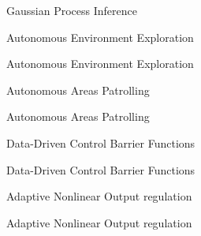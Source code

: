 \documentclass[10pt,aspectratio=169]{beamer}
\begin{document}
\begin{frame}[t]{Gaussian Process Inference}  
	
\end{frame}

\begin{frame}[t]{Autonomous Environment Exploration}
	
\end{frame}

\begin{frame}[t]{Autonomous Environment Exploration}
	
\end{frame}

\begin{frame}[t]{Autonomous Areas Patrolling}
	
\end{frame}

\begin{frame}[t]{Autonomous Areas Patrolling}
	
\end{frame}

\begin{frame}[t]{Data-Driven Control Barrier Functions}  
	
\end{frame}

\begin{frame}[t]{Data-Driven Control Barrier Functions}  
	
\end{frame}

\begin{frame}[t]{Adaptive Nonlinear Output regulation}  
	
\end{frame}

\begin{frame}[t]{Adaptive Nonlinear Output regulation}  

\end{frame}
\end{document}
